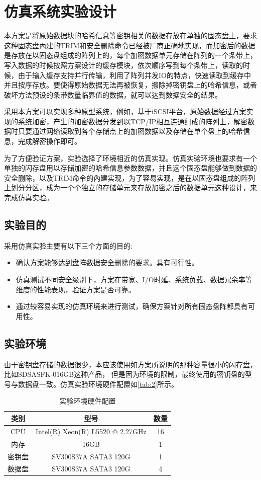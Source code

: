 \chapter{仿真系统实验设计}
本方案是将原始数据块的哈希信息等密钥相关的数据存放在单独的固态盘上，要求这种固态盘內建的TRIM和安全删除命令已经被厂商正确地实现，而加密后的数据是存放在以固态盘组成的阵列上的，每个加密数据单元存储在阵列的一个条带上，写入数据的时候按照方案设计的缓存模块，依次顺序写到每个条带上，读取的时候，由于输入缓存支持并行传输，利用了阵列并发IO的特点，快速读取到缓存中并且按序存放。要使得原始数据无法再被恢复，擦除掉密钥盘上的哈希信息，或者破坏方法预设的条带数量临界值的数据，就可以达到数据安全的结果。


采用本方案可以实现多种原型系统，例如，基于iSCSI平台，原始数据经过方案实现的系统加密，产生的加密数据分发到以TCP/IP相互连通组成的阵列上，解密数据时只要通过网络读取到各个存储点上的加密数据以及存储在单个盘上的哈希信息，完成解密操作即可。


为了方便验证方案，实验选择了环境相近的仿真实现。仿真实验环境也要求有一个单独的闪存盘用以存储加密的哈希信息参数数据，并且这个固态盘能够做到数据的安全删除，以及TRIM命令的內建实现，为了容易实现，是在以固态盘组成的阵列上划分分区，成为一个个独立的存储单元来存放加密之后的数据单元这种设计，来完成仿真实验。
\section{实验目的}
采用仿真实验主要有以下三个方面的目的:
\begin{itemize}
	\item 确认方案能够达到盘阵数据安全删除的要求。具有可行性。
	\item 仿真测试不同安全级别下，方案在带宽、I/O时延、系统负载、数据冗余率等维度的性能表现，验证方案是否可靠。
	\item 通过较容易实现的仿真环境来进行测试，确保方案针对所有固态盘阵都具有可用性。
\end{itemize}
\section{实验环境}
由于密钥盘存储的数据很少，本应该使用如方案所说明的那种容量很小的闪存盘，比如SDSASFK-016GB这种产品，
但是因为环境的限制，最终使用的密钥盘的型号与数据盘一致。仿真实验环境硬件配置如\autoref{tab:2}所示。
\begin{table}[H]
    \centering
    \caption{实验环境硬件配置}
    \label{tab:2}
    \begin{tabular}{|c|c|c|}
        \hline
        类别 & 型号 & 数量 \\ \hline
        CPU & Intel(R) Xeon(R) L5520  @ 2.27GHz & 16 \\ \hline
        内存 & 16GB & 1 \\ \hline
        密钥盘 & SV300S37A SATA3 120G & 1 \\ \hline
        数据盘 & SV300S37A SATA3 120G & 4 \\ \hline
    \end{tabular}
\end{table}
